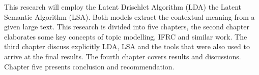 This research will employ the Latent Drischlet Algorithm (LDA)
the Latent Semantic Algorithm (LSA). Both models extract the contextual meaning from a given large text. 
This research is divided into five chapters, the second chapter elaborates some key concepts of topic modelling, IFRC and similar work. The third chapter discuss explicitly LDA, LSA and the tools that were also used to arrive at the final results. The fourth chapter covers results and discussions. Chapter five presents conclusion and recommendation.

